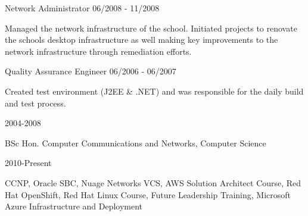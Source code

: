 \documentclass[11pt]{article} %
\begin{document}
\begin{description}
           {Network Administrator}
           {06/2008 - 11/2008}

Managed the network infrastructure of the school. Initiated projects to renovate the schools desktop infrastructure as well making key improvements to the network infrastructure through remediation efforts.

           {Quality Assurance Engineer}
           {06/2006 - 06/2007}

Created test environment (J2EE \& .NET) and was responsible for the daily build and test process.


\end{description}


\begin{description}
\squish
{}
           {}
           {2004-2008}

BSc Hon. Computer Communications and Networks, Computer Science

           {}
           {2010-Present}

CCNP, Oracle SBC, Nuage Networks VCS, AWS Solution Architect Course, Red Hat OpenShift, Red Hat Linux Course, Future Leadership Training, Microsoft Azure Infrastructure and Deployment


\end{description}

%
%
%
%
%
\end{document}
